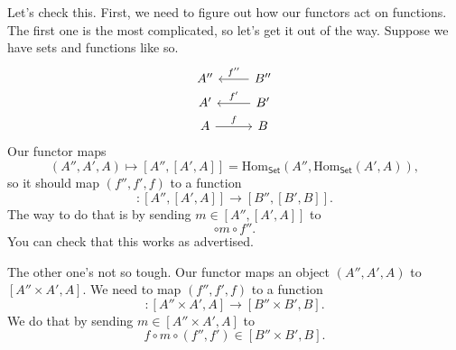 \documentclass[a4paper,10pt]{scrreprt}
\newcommand{\Hom}{\mathrm{Hom}}
\theoremstyle{definition}
\theoremstyle{plain}
\theoremstyle{remark}
\begin{document}
Let's check this. First, we need to figure out how our functors act on functions. The first one is the most complicated, so let's get it out of the way. Suppose we have sets and functions like so.
\begin{equation*}
  \begin{tikzcd}[row sep=tiny]
    A''
    & B''
    \arrow[l, swap, "f''"]
    \\
    A'
    & B'
    \arrow[l, swap, "f'"]
    \\
    A 
    \arrow[r, "f"]
    & B
  \end{tikzcd}
\end{equation*}
Our functor maps
\begin{equation*}
  (A'', A', A) \mapsto [A'', [A', A]] = \Hom_{\mathsf{Set}}(A'', \Hom_{\mathsf{Set}}(A', A)),
\end{equation*}
so it should map $(f'', f', f)$ to a function
\begin{equation*}
  [f'', [f', f]\colon [A'', [A', A]] \to [B'', [B', B]].
\end{equation*}
The way to do that is by sending $m \in [A'', [A', A]]$ to 
\begin{equation*}
  [f', f] \circ m \circ f''.
\end{equation*}
You can check that this works as advertised.

The other one's not so tough. Our functor maps an object $(A'', A', A)$ to $[A'' \times A', A]$. We need to map $(f'', f', f)$ to a function
\begin{equation*}
  [f'' \times f' , f]\colon [A'' \times A', A] \to [B'' \times B', B].
\end{equation*}
We do that by sending $m \in [A'' \times A', A]$ to
\begin{equation*}
  f \circ m \circ (f'', f') \in [B'' \times B', B].
\end{equation*}
\end{document}
